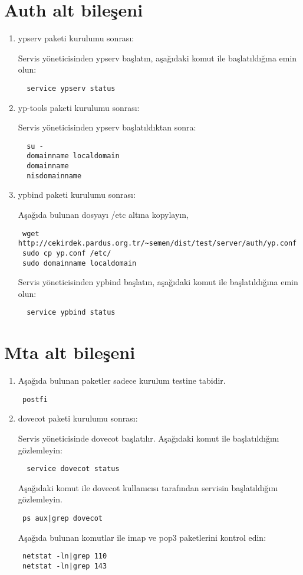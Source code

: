 \documentclass[a4paper,10pt]{article}
\begin{document}
\section{Auth alt bileşeni}
\begin{enumerate}
 \item ypserv paketi kurulumu sonrası:

Servis yöneticisinden ypserv başlatın, aşağıdaki komut ile başlatıldığına emin olun:
\begin{verbatim}
  service ypserv status
\end{verbatim}

\item yp-tools paketi kurulumu sonrası:

Servis yöneticisinden ypserv başlatıldıktan sonra:
\begin{verbatim}
  su -
  domainname localdomain
  domainname
  nisdomainname
\end{verbatim}

\item ypbind paketi kurulumu sonrası:

Aşağıda bulunan dosyayı /etc altına kopylayın,
\begin{verbatim}
 wget http://cekirdek.pardus.org.tr/~semen/dist/test/server/auth/yp.conf 
 sudo cp yp.conf /etc/
 sudo domainname localdomain
\end{verbatim}

Servis yöneticisinden ypbind başlatın, aşağıdaki komut ile başlatıldığına emin olun:
\begin{verbatim}
  service ypbind status
\end{verbatim}

\end{enumerate}

\section{Mta alt bileşeni}
\begin{enumerate}
\item Aşağıda bulunan paketler sadece kurulum testine tabidir.

\begin{verbatim}
 postfi
\end{verbatim}

 \item dovecot paketi kurulumu sonrası:

Servis yöneticisinde dovecot başlatılır.
Aşağıdaki komut ile başlatıldığını gözlemleyin:
\begin{verbatim}
  service dovecot status
\end{verbatim}
Aşağıdaki komut ile dovecot kullanıcısı tarafından servisin başlatıldığını gözlemleyin.
\begin{verbatim}
 ps aux|grep dovecot 
\end{verbatim}

Aşağıda bulunan komutlar ile imap ve pop3 paketlerini kontrol edin:
\begin{verbatim}
 netstat -ln|grep 110
 netstat -ln|grep 143
\end{verbatim}

\end{enumerate}
\end{document}

